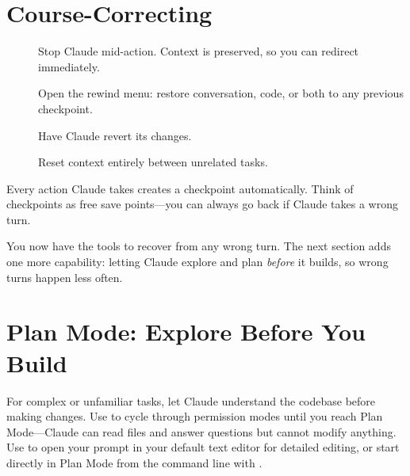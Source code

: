 \section{Course-Correcting}
\label{sec:course-correct}


\begin{description}
  \item[] Stop Claude mid-action. Context is preserved,
    so you can redirect immediately.
  \item[] Open the rewind menu: restore conversation,
    code, or both to any previous checkpoint.
  \item[] Have Claude revert its changes.
  \item[] Reset context entirely between unrelated tasks.
\end{description}

Every action Claude takes creates a checkpoint automatically.
Think of checkpoints as free save points---you can always
go back if Claude takes a wrong turn.


\begin{whybox}
You now have the tools to recover from any wrong turn. The next section adds one more capability: letting Claude explore and plan \emph{before} it builds, so wrong turns happen less often.
\end{whybox}

\section{Plan Mode: Explore Before You Build}
\label{sec:plan-mode}


For complex or unfamiliar tasks, let Claude understand the codebase
before making changes. Use  to cycle through
permission modes until you reach Plan Mode---Claude can read files
and answer questions but cannot modify anything. Use 
to open your prompt in your default text editor for detailed editing,
or start directly in Plan Mode from the command line with
.

